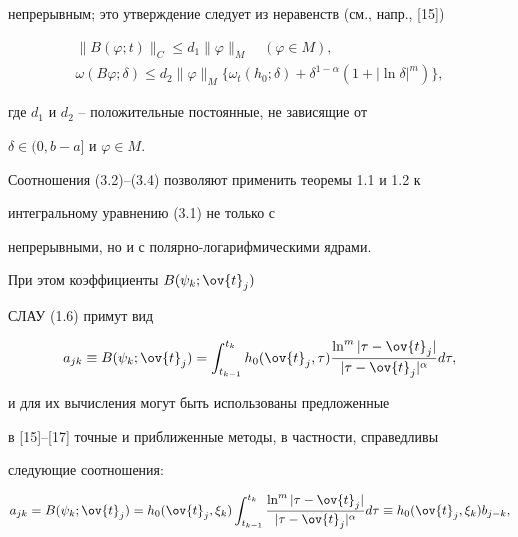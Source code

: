 непрерывным; это утверждение следует из неравенств (см., напр., [15])


\begin{gather}


\|B(\varphi;t)\|_C\leq d_1\|\varphi\|_M\quad (\varphi\in M), \\


%


\omega(B\varphi;\delta)\leq d_2\|\varphi\|_M\{\omega_t(h_0;\delta)+


\delta^{1-\alpha}(1+|\ln \delta|^m)\},


\end{gather}


где $d_1$ и $d_2$ -- положительные постоянные, не зависящие от


$\delta\in (0,b-a]$ и $\varphi\in M$.





Соотношения (3.2)--(3.4) позволяют применить теоремы 1.1 и 1.2 к 


интегральному уравнению (3.1) не только с


непрерывными, но и с полярно-логарифмическими ядрами.


При этом коэффициенты $B(\psi_k;\ov{t}_j)$


СЛАУ (1.6) примут вид


\begin{equation}


a_{jk}\equiv B(\psi_k;\ov{t}_j)=\intl_{t_{k-1}}^{t_k}


h_0(\ov{t}_j,\tau)\frac{\ln^m|\tau -\ov{t}_j|}{|\tau -\ov{t}


_j|^\alpha}d\tau,


\end{equation}


и для их вычисления могут быть использованы предложенные


в [15]--[17] точные и приближенные методы, в частности, справедливы


следующие соотношения:


\begin{equation}


a_{jk}=B(\psi_k;\ov{t}_j)=h_0(\ov{t}_j,\xi_k)


\intl_{t_{k-1}}^{t_k}\frac{\ln^m|\tau -\ov{t}_j|}{|\tau -


\ov{t}_j|^\alpha}d\tau \equiv h_0(\ov{t}_j,\xi_k)b_{j-k},


\end{equation}


